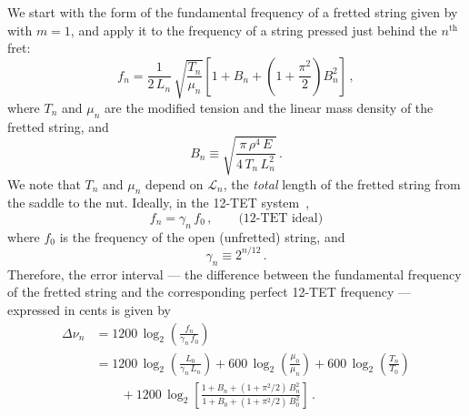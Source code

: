 We start with the form of the fundamental frequency of a fretted string given by  with $m = 1$, and apply it to the frequency of a string pressed just behind the $n^\mathrm{th}$ fret:
 \begin{equation} \label{eqn:f_n_def}
f_n = \frac{1}{2\, L_n}\, \sqrt{\frac{T_n}{\mu_n}} \left[ 1 + B_n + \left(1 + \frac{\pi^2}{2}\right) B_n^2 \right]\, ,
 \end{equation}
where $T_n$ and $\mu_n$ are the modified tension and the linear mass density of the fretted string, and
 \begin{equation} \label{eqn:b_n_def}
B_n \equiv \sqrt{\frac{\pi\, \rho^4\, E}{4\, T_n\, L_n^2}}\, .
 \end{equation}
We note that $T_n$ and $\mu_n$ depend on $\mathcal{L}_n$, the \emph{total} length of the fretted string from the saddle to the nut. Ideally, in the 12-TET system~\cite{ref:durfee2015pms},
 \begin{equation} \label{eqn:f_n_tet}
f_n = \gamma_n\, f_0\, , \qquad \textrm{(12-TET~ideal)}
 \end{equation}
where $f_0$ is the frequency of the open (unfretted) string, and
 \begin{equation} \label{eqn:gamme_n_def}
\gamma_n \equiv 2^{n / 12}\, .
 \end{equation}
Therefore, the error interval --- the difference between the fundamental frequency of the fretted string and the corresponding perfect 12-TET frequency --- expressed in cents is given by
 \begin{equation}\label{eqn:error_def}
 \begin{split}
\Delta \nu_n &= 1200\, \log_2\left( \frac{f_n}{\gamma_n\, f_0} \right) \\
&= 1200\, \log_2 \left( \frac{L_0}{\gamma_n\, L_n} \right) + 600\, \log_2 \left(  \frac{\mu_0}{\mu_n} \right) + 600\, \log_2 \left( \frac{T_n}{T_0} \right) \\
&\qquad + 1200\, \log_2 \left[ \frac{1 + B_n + (1 + \pi^2/2)\, B_n^2}{1 + B_0 + (1 + \pi^2/2)\, B_0^2} \right]\, .
 \end{split}
 \end{equation}

